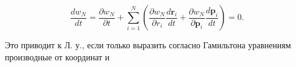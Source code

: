 \documentclass[10pt]{article}
\begin{document}
\[

\frac{d w_{N}}{d t}=\frac{\partial w_{N}}{\partial t}+\sum_{i=1}^{N}\left(\frac{\partial w_{N}}{\partial r_{i}} \frac{d \boldsymbol{r}_{i}}{d t}+\frac{\partial w_{N}}{\partial \boldsymbol{p}_{i}} \frac{d \boldsymbol{p}_{i}}{d t}\right)=0 .

\]



Это приводит к Л. у., если только выразить согласно Гамильтона уравнениям производные от координат и
\end{document}
